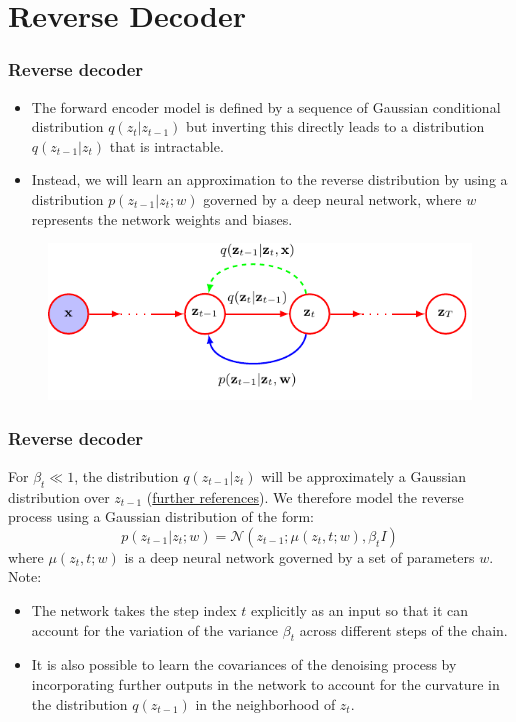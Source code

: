 \documentclass{beamer}
\begin{document}
\section{Reverse Decoder}

\begin{frame}
    \frametitle{Reverse decoder}
    \begin{itemize}
        \item The forward encoder model is defined by a sequence of Gaussian conditional distribution $q(z_{t}|z_{t-1})$ but inverting this directly leads to a distribution $q(z_{t-1}|z_{t})$ that is intractable.
        \item Instead, we will learn an approximation to the reverse distribution by using a distribution $p(z_{t-1}|z_{t};w)$ governed by a deep neural network, where $w$ represents the network weights and biases.
    \end{itemize}
    \begin{figure}
        \includegraphics{Figure_2.pdf}
    \end{figure}
\end{frame}

\begin{frame}
    \frametitle{Reverse decoder}
    For $\beta_{t}\ll{}1$, the distribution $q(z_{t-1}|z_{t})$ will be approximately a Gaussian distribution over $z_{t-1}$ (\href{https://arxiv.org/pdf/1503.03585}{further references}). We therefore model the reverse process using a Gaussian distribution of the form:
    \begin{equation*}
        p(z_{t-1}|z_{t};w)=\mathcal{N}(z_{t-1};\mu(z_{t},t;w),\beta_{t}I)
    \end{equation*}
    where $\mu(z_{t},t;w)$ is a deep neural network governed by a set of parameters $w$. Note:
    \begin{itemize}
        \item The network takes the step index $t$ explicitly as an input so that it can account for the variation of the variance $\beta_{t}$ across different steps of the chain.
        \item It is also possible to learn the covariances of the denoising process by incorporating further outputs in the network to account for the curvature in the distribution $q(z_{t-1})$ in the neighborhood of $z_{t}$.
    \end{itemize}
\end{frame}
\end{document}
